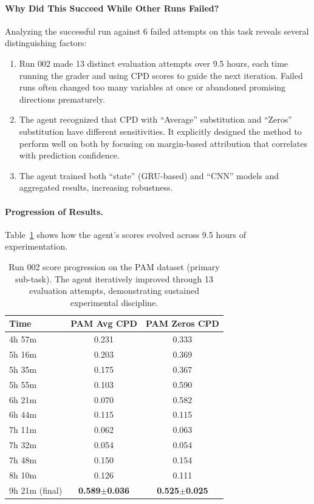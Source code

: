 \documentclass[11pt]{article}
\theoremstyle{plain}
\theoremstyle{definition}
\theoremstyle{remark}
\begin{document}
\paragraph{Why Did This Succeed While Other Runs Failed?}
Analyzing the successful run against 6 failed attempts on this task reveals several distinguishing factors:

\begin{enumerate}
    \item Run 002 made 13 distinct evaluation attempts over 9.5 hours, each time running the grader and using CPD scores to guide the next iteration. Failed runs often changed too many variables at once or abandoned promising directions prematurely.

    \item The agent recognized that CPD with ``Average'' substitution and ``Zeros'' substitution have different sensitivities. It explicitly designed the method to perform well on both by focusing on margin-based attribution that correlates with prediction confidence.

    \item The agent trained both ``state'' (GRU-based) and ``CNN'' models and aggregated results, increasing robustness.
\end{enumerate}

\paragraph{Progression of Results.}
Table~\ref{tab:tim-run002-progression} shows how the agent's scores evolved across 9.5 hours of experimentation.

\begin{table}[h!]
\centering
\small
\setlength{\tabcolsep}{4pt}
\caption{Run 002 score progression on the PAM dataset (primary sub-task). The agent iteratively improved through 13 evaluation attempts, demonstrating sustained experimental discipline.}
\label{tab:tim-run002-progression}
\begin{tabular}{lcc}
\toprule
\textbf{Time} & \textbf{PAM Avg CPD} & \textbf{PAM Zeros CPD} \\
\midrule
4h 57m & 0.231 & 0.333 \\
5h 16m & 0.203 & 0.369 \\
5h 35m & 0.175 & 0.367 \\
5h 55m & 0.103 & 0.590 \\
6h 21m & 0.070 & 0.582 \\
6h 44m & 0.115 & 0.115 \\
7h 11m & 0.062 & 0.063 \\
7h 32m & 0.054 & 0.054 \\
7h 48m & 0.150 & 0.154 \\
8h 10m & 0.126 & 0.111 \\
9h 21m (final) & \textbf{0.589$\pm$0.036} & \textbf{0.525$\pm$0.025} \\
\bottomrule
\end{tabular}
\end{table}
\end{document}
